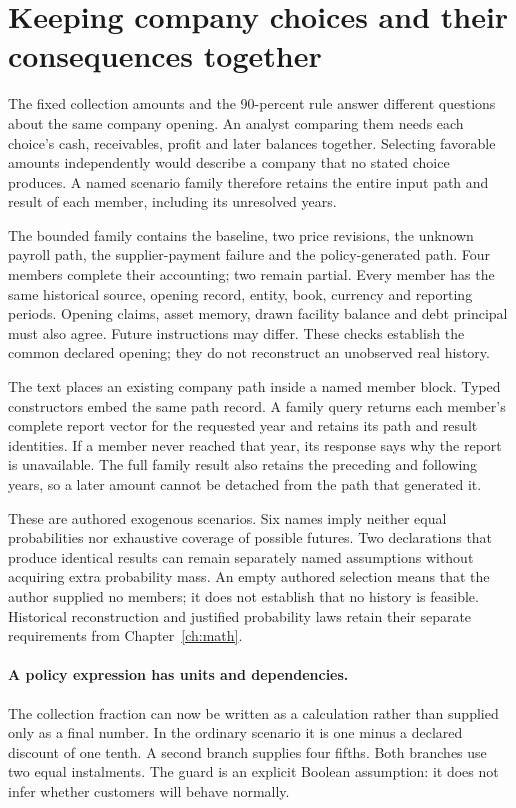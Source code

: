 \section{Keeping company choices and their consequences together}
\label{sec:company-family-language}

The fixed collection amounts and the 90-percent rule answer different questions
about the same company opening. An analyst comparing them needs each choice's
cash, receivables, profit and later balances together. Selecting favorable
amounts independently would describe a company that no stated choice produces.
A named scenario family therefore retains the entire input path and result of
each member, including its unresolved years.

The bounded family contains the baseline, two price revisions, the unknown
payroll path, the supplier-payment failure and the policy-generated path. Four
members complete their accounting; two remain partial. Every member has the
same historical source, opening record, entity, book, currency and reporting
periods. Opening claims, asset memory, drawn facility balance and debt principal
must also agree. Future instructions may differ. These checks establish the
common declared opening; they do not reconstruct an unobserved real history.

The text places an existing company path inside a named member block. Typed
constructors embed the same path record. A family query returns each member's
complete report vector for the requested year and retains its path and result
identities. If a member never reached that year, its response says why the
report is unavailable. The full family result also retains the preceding and
following years, so a later amount cannot be detached from the path that
generated it.

These are authored exogenous scenarios. Six names imply neither equal
probabilities nor exhaustive coverage of possible futures. Two declarations
that produce identical results can remain separately named assumptions without
acquiring extra probability mass. An empty authored selection means that the
author supplied no members; it does not establish that no history is feasible.
Historical reconstruction and justified probability laws retain their separate
requirements from Chapter~\ref{ch:math}.

\paragraph{A policy expression has units and dependencies.}
The collection fraction can now be written as a calculation rather than supplied
only as a final number. In the ordinary scenario it is one minus a declared
discount of one tenth. A second branch supplies four fifths. Both branches use
two equal instalments. The guard is an explicit Boolean assumption: it does
not infer whether customers will behave normally.

